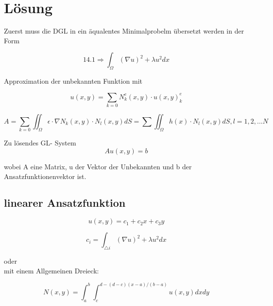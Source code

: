 %
%
%
\section{Lösung
\label{fem:section:loesung}}
Zuerst muss die DGL in ein äqualentes Minimalprobelm übersetzt werden in der Form

\begin{equation}
14.1 \Rightarrow \int_\Omega (\nabla u)^2 +\lambda u^2 dx
\label{fem:equation3}
\end{equation}


Approximation der unbekannten Funktion mit 

\begin{equation}
u(x,y) =  \sum_{k=0} N_k^e(x,y) \cdot u(x,y)_k^e
\label{fem:equation3}
\end{equation}



\begin{equation}
A =  \sum_{k=0} \iint_{\!\!\!\!\!\!\!\Omega} \epsilon \cdot \nabla N_k(x,y) \cdot N_l(x,y) dS = \sum \iint_{\!\!\!\!\!\!\!\Omega} h(x) \cdot N_l(x,y) dS, l = 1,2,...N
\label{fem:equation3}
\end{equation}

Zu lösendes GL- System
\begin{equation}
Au(x,y) = b
\label{fem:GL}
\end{equation}

wobei A eine Matrix, u der Vektor der Unbekannten und b der Ansatzfunktionenvektor ist.

\subsection{linearer Ansatzfunktion
\label{fem:subsection:bonorum}}

\begin{equation}
u(x,y) = c_1 + c_2x + c_3y
\label{fem:equation3}
\end{equation}

\begin{equation}
c_i= \int_{\triangle i} (\nabla u)^2 +\lambda u^2 dx
\label{fem:equation3}
\end{equation}

oder\\
mit einem Allgemeinen Dreieck:

\begin{equation}
N(x,y) = \int_a^b\int_c^{d-(d-c)(x-a)/(b-a)} u(x,y) dxdy
\label{fem:Dreieck_alg}
\end{equation}

